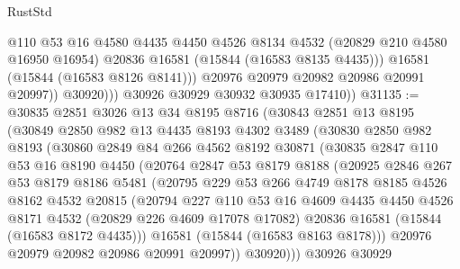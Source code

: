 \begin{lexlean}{RustStd}
\begin{coremodule}
                      @110
                      @53
                      @16
                      @4580
                      @4435
                      @4450
                      @4526
                      @8134
                      @4532
                      (@20829 @210 @4580 @16950 @16954)
                      @20836
                      @16581
                      (@15844 (@16583 @8135 @4435)))
                    @16581
                    (@15844 (@16583 @8126 @8141)))
                  @20976
                  @20979
                  @20982
                  @20986
                  @20991
                  @20997))
              @30920)))
        @30926
        @30929
        @30932
        @30935
        @17410))
@31135 := @30835
    @2851
    @3026
    @13
    @34
    @8195
    @8716
    (@30843
      @2851
      @13
      @8195
      (@30849
        @2850
        @982
        @13
        @4435
        @8193
        @4302
        @3489
        (@30830
          @2850
          @982
          @8193
          (@30860
            @2849
            @84
            @266
            @4562
            @8192
            @30871
            (@30835
              @2847
              @110
              @53
              @16
              @8190
              @4450
              (@20764
                @2847
                @53
                @8179
                @8188
                (@20925
                  @2846
                  @267
                  @53
                  @8179
                  @8186
                  @5481
                  (@20795
                    @229
                    @53
                    @266
                    @4749
                    @8178
                    @8185
                    @4526
                    @8162
                    @4532
                    @20815
                    (@20794
                      @227
                      @110
                      @53
                      @16
                      @4609
                      @4435
                      @4450
                      @4526
                      @8171
                      @4532
                      (@20829 @226 @4609 @17078 @17082)
                      @20836
                      @16581
                      (@15844 (@16583 @8172 @4435)))
                    @16581
                    (@15844 (@16583 @8163 @8178)))
                  @20976
                  @20979
                  @20982
                  @20986
                  @20991
                  @20997))
              @30920)))
        @30926
        @30929

\end{coremodule}
\end{lexlean}
